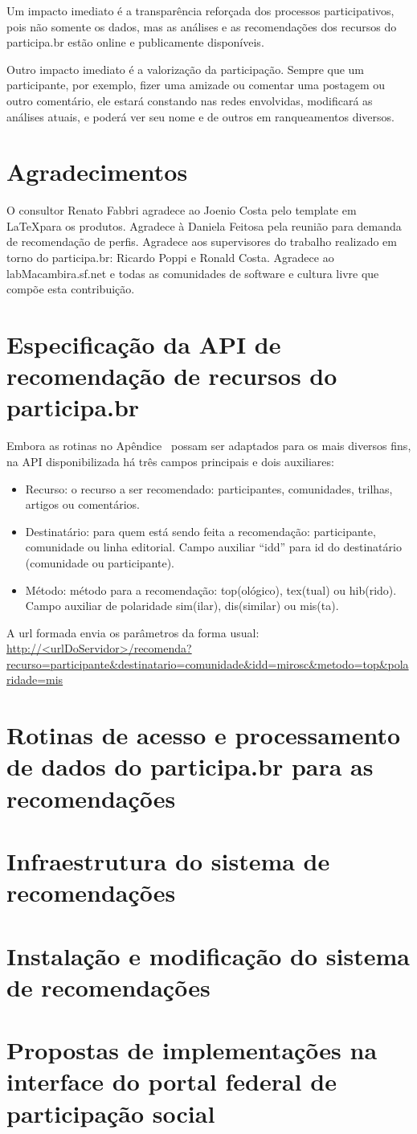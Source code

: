 \documentclass[12pt]{article}
\begin{document}
Um impacto imediato é a transparência reforçada dos processos participativos, pois não somente os dados, mas as análises e as recomendações dos recursos do participa.br estão online e publicamente disponíveis.

Outro impacto imediato é a valorização da participação. Sempre que um participante, por exemplo, fizer uma amizade ou comentar uma postagem ou outro comentário, ele estará constando nas redes envolvidas, modificará as análises atuais, e poderá ver seu nome e de outros em ranqueamentos diversos.

\section{Agradecimentos}
O consultor Renato Fabbri agradece ao Joenio Costa pelo template em \LaTeX para os produtos. Agradece à Daniela Feitosa pela reunião para demanda de recomendação de perfis. Agradece aos supervisores do trabalho realizado em torno do participa.br: Ricardo Poppi e Ronald Costa. Agradece ao labMacambira.sf.net e todas as comunidades de software e cultura livre que compõe esta contribuição.
\newpage

\newpage

\newpage
\printindex
\newpage
%
\appendix
\section{Especificação da API de recomendação de recursos do participa.br}\label{sec:api}
Embora as rotinas no Apêndice~\cite{sec:algs} possam ser adaptados para os mais diversos fins, na API disponibilizada há três campos principais e dois auxiliares:
\begin{itemize}
    \item Recurso: o recurso a ser recomendado: participantes, comunidades, trilhas, artigos ou comentários.
    \item Destinatário: para quem está sendo feita a recomendação: participante, comunidade ou linha editorial. Campo auxiliar ``idd'' para id do destinatário (comunidade ou participante).
    \item Método: método para a recomendação: top(ológico), tex(tual) ou hib(rido). Campo auxiliar de polaridade sim(ilar), dis(similar) ou mis(ta).
\end{itemize} 
A url formada envia os parâmetros da forma usual:
\url{http://<urlDoServidor>/recomenda?recurso=participante&destinatario=comunidade&idd=mirosc&metodo=top&polaridade=mis}
\section{Rotinas de acesso e processamento de dados do participa.br para as recomendações}\label{sec:algs}
\section{Infraestrutura do sistema de recomendações}
\section{Instalação e modificação do sistema de recomendações}
\section{Propostas de implementações na interface do portal federal de participação social}\label{sec:acr}
\end{document}
